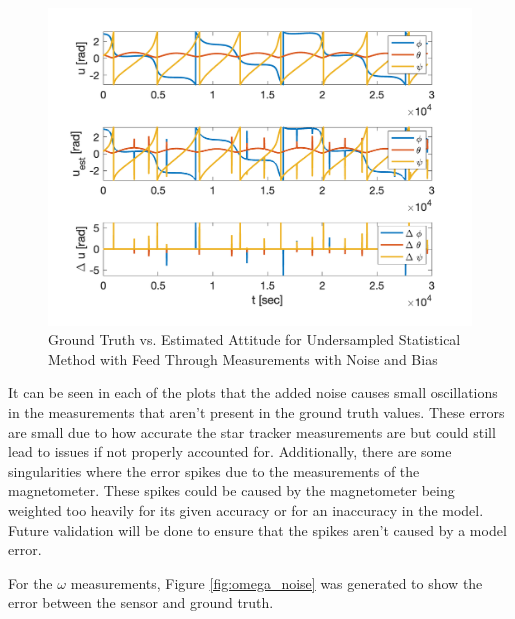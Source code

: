 \begin{figure}[H]
    \centering
    \captionsetup{ justification = centering }
    \includegraphics[width = 12cm]{Images/PS7/attitude_estimation_undersampled_q_default.png}
    \caption{Ground Truth vs. Estimated Attitude for Undersampled Statistical Method with Feed Through Measurements with Noise and Bias}
    \label{fig:stat_attitude_undersampled_default_noise}
\end{figure}

It can be seen in each of the plots that the added noise causes small oscillations in the measurements that aren't present in the ground truth values. These errors are small due to how accurate the star tracker measurements are but could still lead to issues if not properly accounted for. Additionally, there are some singularities where the error spikes due to the measurements of the magnetometer. These spikes could be caused by the magnetometer being weighted too heavily for its given accuracy or for an inaccuracy in the model. Future validation will be done to ensure that the spikes aren't caused by a model error.

For the $\omega$ measurements, Figure \ref{fig:omega_noise} was generated to show the error between the sensor and ground truth.

